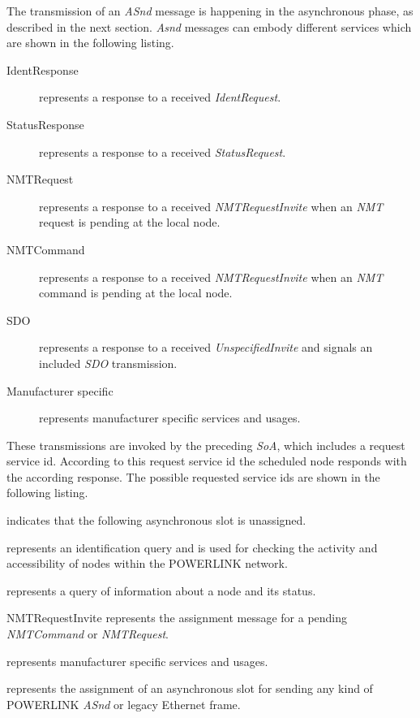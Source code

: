 The transmission of an \emph{ASnd} message is happening in the asynchronous phase, as described in the next section.
\emph{Asnd} messages can embody different services which are shown in the following listing.\cite[section 4.6.1.1.6.1]{epsg_epsg_2013}

\begin{description}
    \item[IdentResponse] represents a response to a received \emph{IdentRequest}.
    \item[StatusResponse] represents a response to a received \emph{StatusRequest}.
    \item[NMTRequest] represents a response to a received \emph{NMTRequestInvite} when an \emph{NMT} request is pending at the local node.
    \item[NMTCommand] represents a response to a received \emph{NMTRequestInvite} when an \emph{NMT} command is pending at the local node.
    \item[SDO] represents a response to a received \emph{UnspecifiedInvite} and signals an included \emph{SDO} transmission.
    \item[Manufacturer specific] represents manufacturer specific services and usages.
\end{description}

These transmissions are invoked by the preceding \emph{SoA}, which includes a request service id.
According to this request service id the scheduled node responds with the according response.
The possible requested service ids are shown in the following listing. \cite[section 4.6.1.1.5.1]{epsg_epsg_2013}

\begin{description}
    \item[NoService] indicates that the following asynchronous slot is unassigned.
    \item[IdentRequest] represents an identification query and is used for checking the activity and accessibility of nodes within the POWERLINK network.
    \item[StatusRequest] represents a query of information about a node and its status.
    \begin{sloppypar}
    \item[NMTRequestInvite] represents the assignment message for a pending \mbox{\emph{NMTCommand}} or \emph{NMTRequest}.
    \end{sloppypar}
    \item[Manufacturer specific] represents manufacturer specific services and usages.
    \item[UnspecifiedInvite] represents the assignment of an asynchronous slot for sending any kind of POWERLINK \emph{ASnd} or legacy Ethernet frame.
\end{description}


